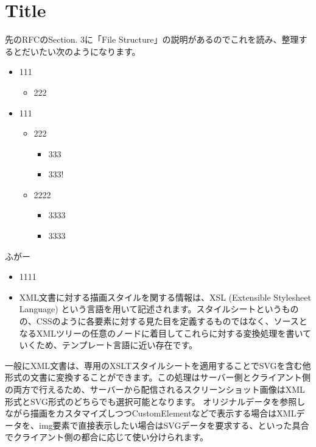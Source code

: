 \chapter{Title}
先のRFCのSection. 3に「File Structure」の説明があるのでこれを読み、整理するとだいたい次のようになります。
\begin{itemize}
  \item 111
  \begin{itemize}
    \item 222
  \end{itemize}
  \item 111
  \begin{itemize}
    \item 222
    \begin{itemize}
      \item 333
      \item 333!
    \end{itemize}
    \item 2222
    \begin{itemize}
      \item 3333
      \item 3333
    \end{itemize}
  \end{itemize}
\end{itemize}

ふがー
\begin{itemize}
  \item 1111
  \item XML文書に対する描画スタイルを関する情報は、XSL (Extensible Stylesheet Language) という言語を用いて記述されます。スタイルシートというものの、CSSのように各要素に対する見た目を定義するものではなく、ソースとなるXMLツリーの任意のノードに着目してこれらに対する変換処理を書いていくため、テンプレート言語に近い存在です。
\end{itemize}

一般にXML文書は、専用のXSLTスタイルシートを適用することでSVGを含む他形式の文書に変換することができます。この処理はサーバー側とクライアント側の両方で行えるため、サーバーから配信されるスクリーンショット画像はXML形式とSVG形式のどちらでも選択可能となります。
オリジナルデータを参照しながら描画をカスタマイズしつつCustomElementなどで表示する場合はXMLデータを、img要素で直接表示したい場合はSVGデータを要求する、といった具合でクライアント側の都合に応じて使い分けられます。\\

